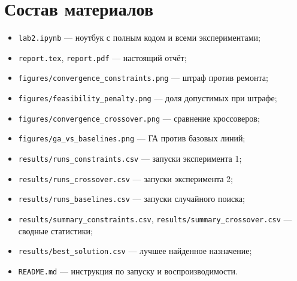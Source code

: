 \documentclass[12pt,a4paper]{article}
\begin{document}
\section*{Состав материалов}

\begin{itemize}
\item \texttt{lab2.ipynb} --- ноутбук с полным кодом и всеми экспериментами;
\item \texttt{report.tex}, \texttt{report.pdf} --- настоящий отчёт;
\item \texttt{figures/convergence\_constraints.png} --- штраф против ремонта;
\item \texttt{figures/feasibility\_penalty.png} --- доля допустимых при штрафе;
\item \texttt{figures/convergence\_crossover.png} --- сравнение кроссоверов;
\item \texttt{figures/ga\_vs\_baselines.png} --- ГА против базовых линий;
\item \texttt{results/runs\_constraints.csv} --- запуски эксперимента 1;
\item \texttt{results/runs\_crossover.csv} --- запуски эксперимента 2;
\item \texttt{results/runs\_baselines.csv} --- запуски случайного поиска;
\item \texttt{results/summary\_constraints.csv},
  \texttt{results/summary\_crossover.csv} --- сводные статистики;
\item \texttt{results/best\_solution.csv} --- лучшее найденное назначение;
\item \texttt{README.md} --- инструкция по запуску и воспроизводимости.
\end{itemize}
\end{document}
